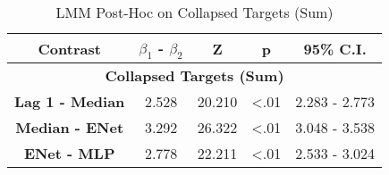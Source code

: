\begin{table}[h]
\centering
\caption{LMM Post-Hoc on Collapsed Targets (Sum)}
\label{collapsed_post_hoc_33}
\begin{tabular}{ccccc}
\hline
\textbf{Contrast}           & \textbf{$\beta_1$ - $\beta_2$} & \textbf{Z} & \textbf{p} & \textbf{95\% C.I.} \\ \hline
\multicolumn{5}{c}{\textbf{Collapsed Targets (Sum)}}                                                 \\ \hline
\textbf{Lag 1 - Median} & 2.528                & 20.210     & \textless .01   & 2.283 - 2.773      \\
\textbf{Median - ENet}          & 3.292                 & 26.322     & \textless .01   & 3.048 - 3.538        \\
\textbf{ENet - MLP}          & 2.778                 & 22.211     & \textless .01   & 2.533 - 3.024        \\ \hline
\end{tabular}
\end{table}